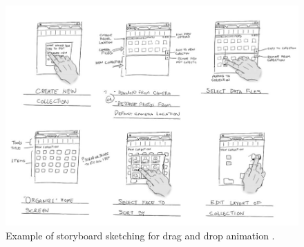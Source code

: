 \begin{figure}[tp]
\centering
\includegraphics[keepaspectratio,width=\hsize,height=\halfh]
{images/storyboard.jpeg}

\caption[Storyboard Sketching]{
Example of storyboard sketching for drag and drop animation 
\citep{microsoftStoryboard}.
}
\label{fig:storyboard}
\end{figure}
